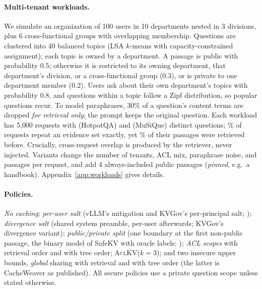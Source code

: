 \documentclass[11pt]{article}
\newcommand{\sysname}{\textsc{AclKV}\xspace}
\begin{document}
\paragraph{Multi-tenant workloads.} We simulate an organization of 100 users in 10 departments nested in 3 divisions, plus 6 cross-functional groups with overlapping membership. Questions are clustered into 40 balanced topics (LSA $k$-means with capacity-constrained assignment); each topic is owned by a department. A passage is public with probability $0.5$; otherwise it is restricted to its owning department, that department's division, or a cross-functional group ($0.3$), or is private to one department member ($0.2$). Users ask about their own department's topics with probability $0.8$, and questions within a topic follow a Zipf distribution, so popular questions recur. To model paraphrases, 30\% of a question's content terms are dropped \emph{for retrieval only}; the prompt keeps the original question. Each workload has 5{,}000 requests with \numdistinctHQ{} (HotpotQA) and \numdistinctMQ{} (MuSiQue) distinct questions; \numexactSetHQ\% of requests repeat an evidence set exactly, yet \numdocsSeenHQ\% of their passages were retrieved before. Crucially, cross-request overlap is produced by the retriever, never injected. Variants change the number of tenants, ACL mix, paraphrase noise, and passages per request, and add 4 always-included public passages (\emph{pinned}, e.g.\ a handbook). Appendix~\ref{app:workloads} gives details.

\paragraph{Policies.} \emph{No caching}; \emph{per-user salt} (vLLM's mitigation and KVGov's per-principal salt; \citealp{vllm2026security,addagada2026kvgov}); \emph{divergence salt} (shared system preamble, per-user afterwards; KVGov's divergence variant); \emph{public/private split} (one boundary at the first non-public passage, the binary model of SafeKV with oracle labels; \citealp{chu2025safekv}); \emph{ACL scopes} with retrieval order and with tree order; \sysname ($k{=}3$); and two insecure upper bounds, \emph{global} sharing with retrieval and with tree order (the latter is CacheWeaver as published). All secure policies use a private question scope unless stated otherwise.
\end{document}
